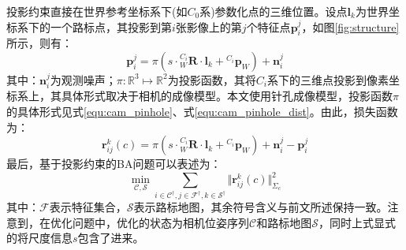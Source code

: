 \begin{enumerate}
        投影约束直接在世界参考坐标系下(如$C_0$系)参数化点的三维位置。设点$\boldsymbol{l}_k$为世界坐标系下的一个路标点，其投影到第$i$张影像上的第$j$个特征点$\boldsymbol{p}_i^j$，如图\ref{fig:structure}所示，则有：
        \begin{equation}
          \boldsymbol{p}_i^j=\pi\left( s \cdot{^{C_i}_{W}\boldsymbol{R}}\cdot\boldsymbol{l}_k+{^{C_i}\boldsymbol{p}_{W}}\right) +\boldsymbol{n}_i^j
        \end{equation}
        其中：$\boldsymbol{n}_i^j$为观测噪声；$\pi:\mathbb{R}^3\mapsto\mathbb{R}^2$为投影函数，其将$C_i$系下的三维点投影到像素坐标系上，其具体形式取决于相机的成像模型。本文使用针孔成像模型，投影函数$\pi$的具体形式见式\ref{equ:cam_pinhole}、式\ref{equ:cam_pinhole_dist}。由此，损失函数为：
        \begin{equation}
          \boldsymbol{r}_{ij}^k(c)=\pi\left( s \cdot{^{C_i}_{W}\boldsymbol{R}}\cdot\boldsymbol{l}_k+{^{C_i}\boldsymbol{p}_{W}}\right)+\boldsymbol{n}_i^j-\boldsymbol{p}_i^j
        \end{equation}
        最后，基于投影约束的BA问题可以表述为：
        \begin{equation}
          \min_{\mathcal{C},\mathcal{S}} \sum_{i\in\mathcal{C}^\dagger,j\in\mathcal{F}^\dagger,k\in\mathcal{S}^\dagger}\Vert \boldsymbol{r}_{ij}^k(c)\Vert^2_{\Sigma_c}
        \end{equation}
        其中：$\mathcal{F}$表示特征集合，$\mathcal{S}$表示路标地图，其余符号含义与前文所述保持一致。注意到，在优化问题中，优化的状态为相机位姿序列$\mathcal{C}$和路标地图$\mathcal{S}$，同时上式显式的将尺度信息$s$包含了进来。


\end{enumerate}
